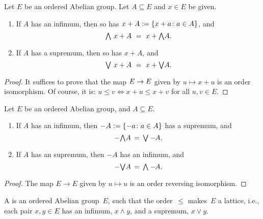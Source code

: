 \documentclass[main.tex]{subfiles}
\begin{document}
%
%
\begin{lem}
\label{L:oag-plus-preserves}
Let $E$ be an ordered Abelian group.
Let $A\subseteq E$ and $x\in E$ be given.
\begin{enumerate}
\item \label{L:oag-plus-preserves-meet}
If $A$ has an infimum,
then so has $x+A := \{ x+a\colon a\in A\}$,
and 
\begin{equation*}
\textstyle{\bigwedge} \,\,x+A \ =\  x+\textstyle{\bigwedge} A.
\end{equation*}
\item \label{L:oag-plus-preserves-join}
If $A$ has a supremum,
then so has $x+A$,
and 
\begin{equation*}
\textstyle{\bigvee} \,\,x+A \ =\  x+\textstyle{\bigvee} A.
\end{equation*}
\end{enumerate}
\end{lem}
\begin{proof}
It suffices to prove that the map $E\rightarrow E$
given by $u\mapsto x + u$ is an order isomorphism.
Of course,
it is: $u\leq v\iff x+u\leq x+v$ for all $u,v\in E$.
\end{proof}
%
%
\begin{lem}
\label{L:oag-minus-preserves}
Let $E$ be an ordered Abelian group,
and $A\subseteq E$.
\begin{enumerate}
\item
If $A$ has an infimum,
then $-A:= \{-a\colon a\in A\}$
has a supremum,
and 
\begin{equation*}
-\textstyle{\bigwedge} A \,=\, \textstyle{\bigvee} -\hspace{-3pt}A.
\end{equation*}
\item
If $A$ has an supremum,
then $-A$
has an infimum, and
\begin{equation*}
-\textstyle{\bigvee} A \,=\, \textstyle{\bigwedge} -\hspace{-3pt}A.
\end{equation*}
\end{enumerate}
\end{lem}
\begin{proof}
The map $E\rightarrow E$ given by
$u\mapsto u$ is an order reversing isomorphism.
\end{proof}
%
%
\begin{dfn}
\label{D:loag}
A 
is an ordered Abelian group~$E$,
such that the order~$\leq$ 
makes~$E$ a lattice,
i.e., each pair $x,y\in E$
has an infimum, $x\wedge y$,
and a supremum, $x\vee y$.
\end{dfn}
\end{document}
